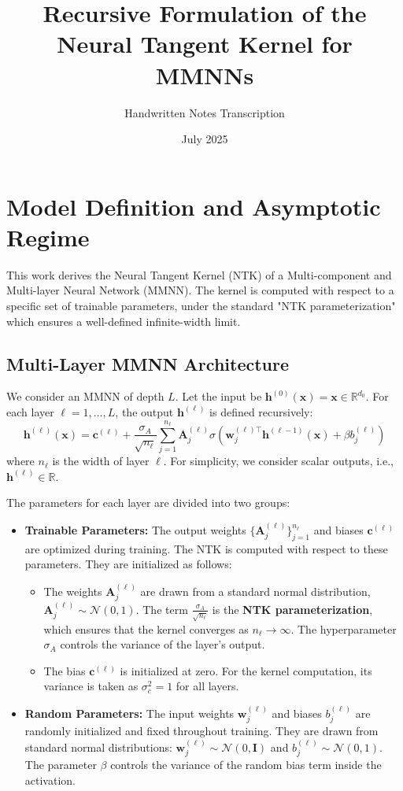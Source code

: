 \documentclass[12pt]{article}
\title{Recursive Formulation of the Neural Tangent Kernel for MMNNs}
\author{Handwritten Notes Transcription}
\date{July 2025}
\begin{document}
\maketitle

\section{Model Definition and Asymptotic Regime}
This work derives the Neural Tangent Kernel (NTK) of a Multi-component and Multi-layer Neural Network (MMNN). The kernel is computed with respect to a specific set of trainable parameters, under the standard "NTK parameterization" which ensures a well-defined infinite-width limit.

\subsection{Multi-Layer MMNN Architecture}
We consider an MMNN of depth $L$. Let the input be $\bm{h}^{(0)}(\bm{x}) = \bm{x} \in \mathbb{R}^{d_0}$. For each layer $\ell = 1, \dots, L$, the output $\bm{h}^{(\ell)}$ is defined recursively:
\begin{equation}
    \bm{h}^{(\ell)}(\bm{x}) = \bm{c}^{(\ell)} + \frac{\sigma_A}{\sqrt{n_\ell}} \sum_{j=1}^{n_\ell} \bm{A}_j^{(\ell)} \sigma\left(\bm{w}_j^{(\ell)\top} \bm{h}^{(\ell-1)}(\bm{x}) + \beta b_j^{(\ell)}\right)
\end{equation}
where $n_\ell$ is the width of layer $\ell$. For simplicity, we consider scalar outputs, i.e., $\bm{h}^{(\ell)} \in \mathbb{R}$.

The parameters for each layer are divided into two groups:
\begin{itemize}
    \item \textbf{Trainable Parameters:} The output weights $\{\bm{A}_j^{(\ell)}\}_{j=1}^{n_\ell}$ and biases $\bm{c}^{(\ell)}$ are optimized during training. The NTK is computed with respect to these parameters. They are initialized as follows:
    \begin{itemize}
        \item The weights $\bm{A}_j^{(\ell)}$ are drawn from a standard normal distribution, $\bm{A}_j^{(\ell)} \sim \mathcal{N}(0, 1)$. The term $\frac{\sigma_A}{\sqrt{n_\ell}}$ is the \textbf{NTK parameterization}, which ensures that the kernel converges as $n_\ell \to \infty$. The hyperparameter $\sigma_A$ controls the variance of the layer's output.
        \item The bias $\bm{c}^{(\ell)}$ is initialized at zero. For the kernel computation, its variance is taken as $\sigma_c^2 = 1$ for all layers.
    \end{itemize}
    \item \textbf{Random Parameters:} The input weights $\bm{w}_j^{(\ell)}$ and biases $b_j^{(\ell)}$ are randomly initialized and fixed throughout training. They are drawn from standard normal distributions: $\bm{w}_j^{(\ell)} \sim \mathcal{N}(0, \mathbf{I})$ and $b_j^{(\ell)} \sim \mathcal{N}(0, 1)$. The parameter $\beta$ controls the variance of the random bias term inside the activation.
\end{itemize}
\end{document}
